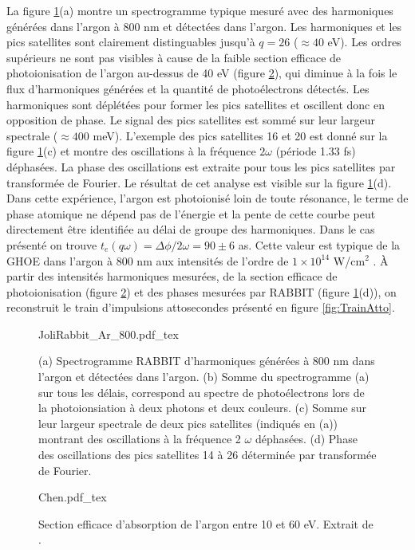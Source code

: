 La figure \ref{fig:JoliRabbit}(a) montre un spectrogramme typique mesuré avec des harmoniques générées dans l'argon à 800 nm et détectées dans l'argon. Les harmoniques et les pics satellites sont clairement distinguables jusqu'à $q = 26$ ($\approx 40$ eV). Les ordres supérieurs ne sont pas visibles à cause de la faible section efficace de photoionisation de l'argon au-dessus de 40 eV (figure \ref{fig:ChenAr}), qui diminue à la fois le flux d'harmoniques générées et la quantité de photoélectrons détectés. Les harmoniques sont déplétées pour former les pics satellites et oscillent donc en opposition de phase. Le signal des pics satellites est sommé sur leur largeur spectrale ($\approx 400$ meV). L'exemple des pics satellites 16 et 20 est donné sur la figure \ref{fig:JoliRabbit}(c) et montre des oscillations à la fréquence $2 \omega$ (période 1.33 fs) déphasées. La phase des oscillations est extraite pour tous les pics satellites par transformée de Fourier. Le résultat de cet analyse est visible sur la figure \ref{fig:JoliRabbit}(d). Dans cette expérience, l'argon est photoionisé loin de toute résonance, le terme de phase atomique ne dépend pas de l'énergie et la pente de cette courbe peut directement être identifiée au délai de groupe des harmoniques. Dans le cas présenté on trouve $t_e (q\omega) = \Delta \phi / 2\omega = 90 \pm 6$ as. Cette valeur est typique de la GHOE dans l'argon à 800 nm aux intensités de l'ordre de $1 \times 10^{14}$ W/cm$^2$ . \`{A} partir des intensités harmoniques mesurées, de la section efficace de photoionisation (figure \ref{fig:ChenAr}) et des phases mesurées par RABBIT (figure \ref{fig:JoliRabbit}(d)), on reconstruit le train d'impulsions attosecondes présenté en figure \ref{fig:TrainAtto}.

\begin{figure}
\centering
\def\svgwidth{\columnwidth}
{JoliRabbit_Ar_800.pdf_tex}
\caption{(a) Spectrogramme RABBIT d'harmoniques générées à 800 nm dans l'argon et détectées dans l'argon. (b) Somme du spectrogramme (a) sur tous les délais, correspond au spectre de photoélectrons lors de la photoionsiation à deux photons et deux couleurs. (c) Somme sur leur largeur spectrale de deux pics satellites (indiqués en (a)) montrant des oscillations à la fréquence 2 $\omega$ déphasées. (d) Phase des oscillations des pics satellites 14 à 26 déterminée par transformée de Fourier.}
\label{fig:JoliRabbit}
\end{figure}

\begin{figure}
\centering
\def\svgwidth{0.6\columnwidth}
{Chen.pdf_tex}
\caption{Section efficace d'absorption de l'argon entre 10 et 60 eV. Extrait de .}
\label{fig:ChenAr}
\end{figure}

